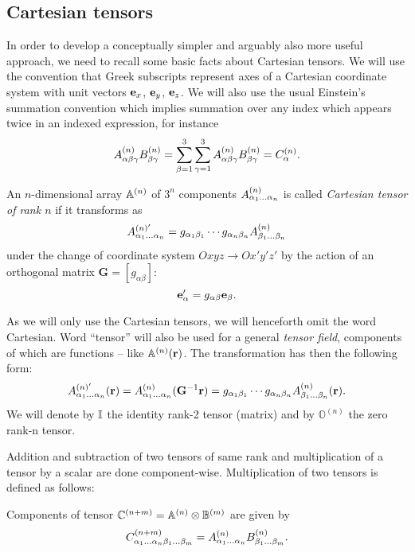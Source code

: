 \subsection{Cartesian tensors}\label{sec:tensors}
In order to develop a conceptually simpler and arguably also more useful approach, we need to recall some basic facts
about Cartesian tensors. We will use the convention that Greek subscripts represent axes of a Cartesian coordinate
system with unit vectors $\be_x$, $\be_y$, $\be_z$. We will also use the usual Einstein's summation convention which
implies summation over any index which appears twice in an indexed expression, for instance $$
  \AAA{\alpha\beta\gamma}\BBB{\beta\gamma} =
  \suma[\beta]{1}{3}\suma[\gamma]{1}{3}\AAA{\alpha\beta\gamma}\BBB{\beta\gamma} = \CCC{\alpha}.
$$

\begin{definition}
  An $n$-dimensional array $\AA$ of $3^n$ components $\AAA{\alpha_1\ldots\alpha_n}$ is called \textit{Cartesian tensor 
  of rank $n$} if it transforms as
  \begin{equation}\label{eq:tenstran}
    A^{(n)'}_{\alpha_1\ldots\alpha_n} = g_{\alpha_1\beta_1}\cdots g_{\alpha_n\beta_n}\AAA{\beta_1\ldots\beta_n}
  \end{equation}
  under the change of coordinate system $Oxyz \to Ox'y'z'$ by the action of an orthogonal matrix $\mathbf{G} = [g_{\alpha\beta}]$:
  $$
    \be_\alpha' = g_{\alpha\beta}\be_\beta.
  $$
\end{definition}
As we will only use the Cartesian tensors, we will henceforth omit the word Cartesian. Word ``tensor'' will also be used
 for a general \textit{tensor field}, components of which are functions -- like $\AA(\br)$. The transformation has then 
 the following form:
$$
  A^{(n)'}_{\alpha_1\ldots\alpha_n}(\br) = \AAA{\alpha_1\ldots\alpha_n}(\mathbf{G}^{-1}\br) = g_{\alpha_1\beta_1}\cdots g_{\alpha_n\beta_n}\AAA{\beta_1\ldots\beta_n}(\br).
$$
We will denote by $\eye$ the identity rank-2 tensor (matrix) and by $ \mathbb{O}^{(n)}$ the zero rank-n tensor.

Addition and subtraction of two tensors of same rank and multiplication of a tensor by a scalar are done component-wise. 
Multiplication of two tensors is defined as follows:
\begin{definition}
  Components of tensor $\CC[n+m] = \AA\otimes\BB[m]$ are given by
  $$
    \CCC[n+m]{\alpha_1\ldots\alpha_n\beta_1\ldots\beta_m} = \AAA{\alpha_1\ldots\alpha_n}\BBB{\beta_1\ldots\beta_m}.
  $$
\end{definition}

